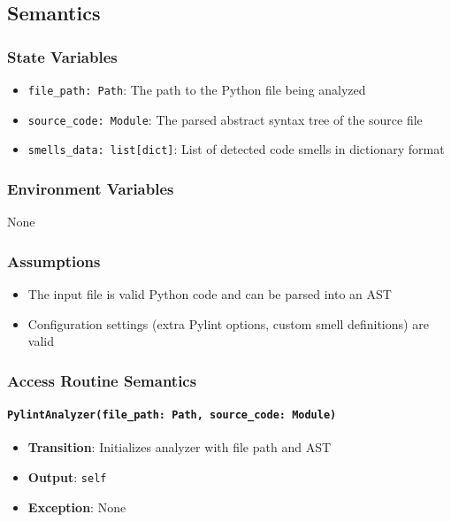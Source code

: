 \documentclass[12pt, titlepage]{article}
\begin{document}
\subsection{Semantics}

\subsubsection{State Variables}
\begin{itemize}
\item \texttt{file\_path: Path}: The path to the Python file being analyzed
\item \texttt{source\_code: Module}: The parsed abstract syntax tree of the source file
\item \texttt{smells\_data: list[dict]}: List of detected code smells in dictionary format
\end{itemize}

\subsubsection{Environment Variables}
None

\subsubsection{Assumptions}
\begin{itemize}
\item The input file is valid Python code and can be parsed into an AST
\item Configuration settings (extra Pylint options, custom smell definitions) are valid
\end{itemize}

\subsubsection{Access Routine Semantics}

\paragraph{\texttt{PylintAnalyzer(file\_path: Path, source\_code: Module)}}
\begin{itemize}
\item \textbf{Transition}: Initializes analyzer with file path and AST
\item \textbf{Output}: \texttt{self}
\item \textbf{Exception}: None
\end{itemize}
\end{document}
